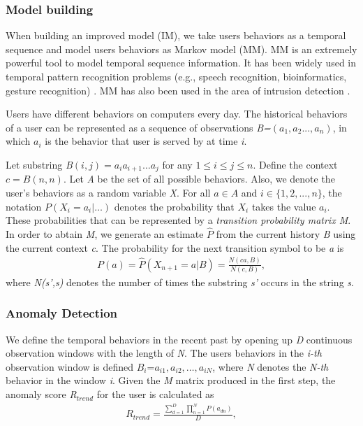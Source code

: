 \documentclass[conference]{IEEEtran}
\begin{document}
\subsubsection{Model building}

When building an improved model (IM), we take users behaviors as a temporal sequence and model users behaviors as Markov model (MM).
MM \cite{b21} is an extremely powerful
tool to model temporal sequence information. It has been
widely used in temporal pattern recognition problems (e.g.,
speech recognition, bioinformatics, gesture recognition) \cite{b23}. MM has also been used
in the area of intrusion detection \cite{b21}.

Users have different behaviors on computers every day. 
The historical behaviors of a user can be represented as a sequence of observations \emph{B=$(a_1,a_2...,a_n)$}, in which \emph{$a_i$} is the behavior that user is served by at time \emph{i}. 

Let substring \emph{B$(i, j) = a_ia_{i+1}\ldots a_j$} for any \emph{$1 \leq i \leq j \leq n$}. Define the context \emph{$c = B(n,n)$}. Let \emph{A} be the set of all possible behaviors. Also, we denote the user's behaviors as a random variable \emph{X}. 
For all \emph{$a \in A $} and \emph{$i \in \{1,2,. . ., n\}$}, the notation \emph{$P(X_i = a_i|\ldots)$} denotes the probability that \emph{$X_i$} takes the value \emph{$a_i$}.
These probabilities that can be represented by a \emph{transition
probability matrix M}. 
In order to abtain \emph{M}, we generate an estimate \emph{$\hat P$} from the current history \emph{B} using the current context \emph{c}. The probability for the next transition symbol to be \emph{a} is
\begin{align}
    P(a)=\hat P(X_{n+1}=a|B)= \frac {N(ca,B)}{N(c,B)},
\end{align}
where \emph{N(s',s)} denotes the number of times the substring \emph{s'} occurs in the string \emph{s}.

\subsubsection{Anomaly Detection}


We define the temporal behaviors in the recent past by opening up \emph{D} continuous observation windows with the length of \emph{N}. The users behaviors in the \emph{i-th} observation window is defined  \emph{$B_i$}=\emph{$a_{i1},a_{i2},\dots,a_{iN}$}, where \emph{N} denotes the \emph{N-th} behavior in the window \emph{i}.
Given the \emph{M} matrix produced in the first step, the anomaly score \emph{R$_{trend}$} for the user is calculated as
\begin{align}
R_{trend}=\frac{\sum_{d=1}^D \prod_{n=1}^N P(a_{dn})}{D},
\end{align}
\end{document}
